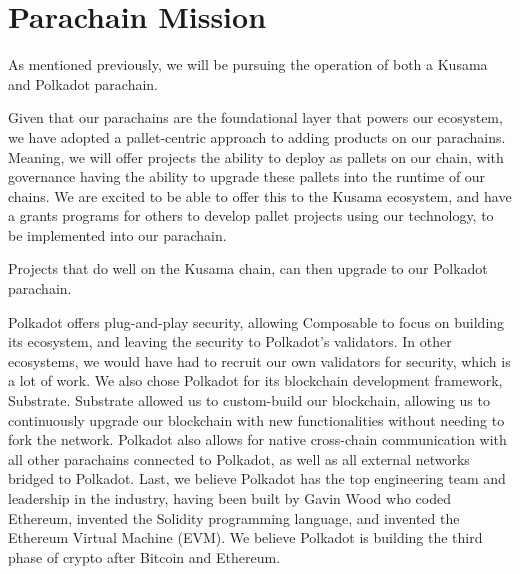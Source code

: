\section{Parachain Mission}

As mentioned previously, we will be pursuing the operation of both a Kusama and Polkadot parachain.

Given that our parachains are the foundational layer that powers our ecosystem, we have adopted a pallet-centric approach to adding products on our parachains. Meaning, we will offer projects the ability to deploy as pallets on our chain, with governance having the ability to upgrade these pallets into the runtime of our chains. We are excited to be able to offer this to the Kusama ecosystem, and have a grants programs for others to develop pallet projects using our technology, to be implemented into our parachain.

Projects that do well on the Kusama chain, can then upgrade to our Polkadot parachain.

Polkadot offers plug-and-play security, allowing Composable to focus on building its ecosystem, and leaving the security to Polkadot’s validators.
%
In other ecosystems, we would have had to recruit our own validators for security, which is a lot of work. We also chose Polkadot for its blockchain development framework, Substrate. Substrate allowed us to custom-build our blockchain, allowing us to continuously upgrade our blockchain with new functionalities without needing to fork the network.
%
Polkadot also allows for native cross-chain communication with all other parachains connected to Polkadot, as well as all external networks bridged to Polkadot.
%
Last, we believe Polkadot has the top engineering team and leadership in the industry, having been built by Gavin Wood who coded Ethereum, invented the Solidity programming language, and invented the Ethereum Virtual Machine (EVM). We believe Polkadot is building the third phase of crypto after Bitcoin and Ethereum.
